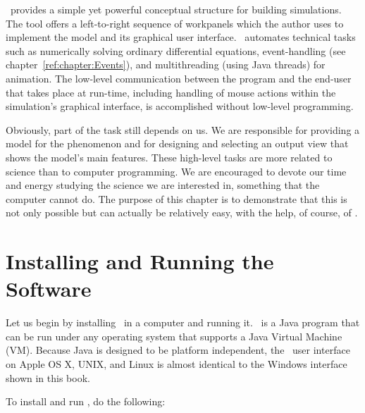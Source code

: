 \ejs\ provides a simple yet powerful conceptual structure for building simulations. The tool offers a left-to-right
sequence of workpanels which the author uses to implement the model and its graphical user interface. \ejs\ automates technical tasks such as numerically solving ordinary differential equations,  event-handling (see chapter~\ref{ref:chapter:Events}), and multithreading (using Java threads) for animation. The low-level communication between the program and the end-user that takes place at run-time, including handling of mouse actions within the simulation's graphical interface, is accomplished without low-level programming.

Obviously, part of the task still depends on us. We are responsible for providing a model for the phenomenon and for
designing and selecting an output view that shows the model's main features. These high-level tasks are more related to
science than to computer programming. We are encouraged to devote our time and energy studying the science we are
interested in, something that the computer cannot do. The purpose of this chapter is to demonstrate that this is not
only possible but can actually be relatively easy, with the help, of course, of \Ejs.

    \section{Installing and Running the Software}\label{section:02Installation}

Let us begin by installing \Ejs\ in a computer and running it. \ejs\ is a Java program that can be run under any
operating system that supports a Java Virtual Machine (VM). Because Java is designed to be platform independent, the
\ejs\ user interface on Apple OS X, UNIX, and Linux is almost identical to the Windows interface shown in this book.

To install and run \ejs, do the following:

